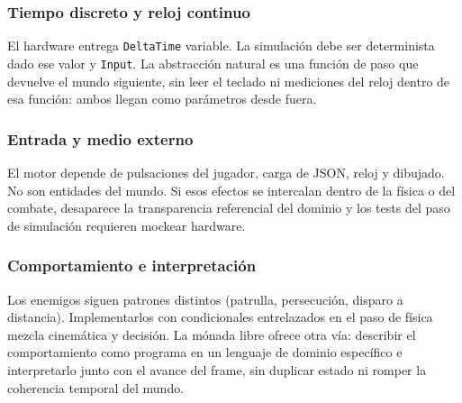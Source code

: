 \subsubsection{Tiempo discreto y reloj continuo}
\label{subsubsec:problema-tiempo}

El hardware entrega \texttt{DeltaTime} variable. La simulación debe ser determinista dado
ese valor y \texttt{Input}. La abstracción natural es una función de paso que devuelve el
mundo siguiente, sin leer el teclado ni mediciones del reloj dentro de esa función: ambos llegan como
parámetros desde fuera.

\subsubsection{Entrada y medio externo}
\label{subsubsec:problema-medio}

El motor depende de pulsaciones del jugador, carga de JSON, reloj y dibujado. No son
entidades del mundo. Si esos efectos se intercalan dentro de la física o del combate,
desaparece la transparencia referencial del dominio y los tests del paso de simulación
requieren mockear hardware.

\subsubsection{Comportamiento e interpretación}
\label{subsubsec:problema-comportamiento}

Los enemigos siguen patrones distintos (patrulla, persecución, disparo a distancia).
Implementarlos con condicionales entrelazados en el paso de física mezcla cinemática y
decisión. La mónada libre ofrece otra vía: describir el comportamiento como programa en un
lenguaje de dominio específico e interpretarlo junto con el avance del frame, sin duplicar estado ni romper la
coherencia temporal del mundo.
